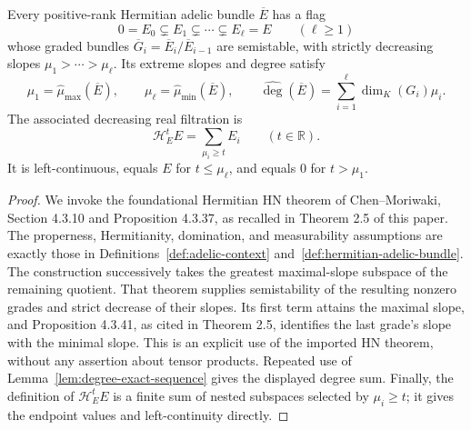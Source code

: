 \begin{theorem}
\label{thm:hermitian-hn-filtration}
\leanok
Every positive-rank Hermitian adelic bundle $\overline E$ has a flag
\[
 0=E_0\subsetneq E_1\subsetneq\cdots\subsetneq E_\ell=E
 \qquad(\ell\ge1)
\]
whose graded bundles $\overline G_i=\overline E_i/\overline E_{i-1}$
are semistable, with strictly decreasing slopes
$\mu_1>\cdots>\mu_\ell$. Its extreme slopes and degree satisfy
\[
 \mu_1=\widehat\mu_{\max}(\overline E),\qquad
 \mu_\ell=\widehat\mu_{\min}(\overline E),\qquad
 \widehat{\deg}(\overline E)=\sum_{i=1}^\ell\dim_K(G_i)\mu_i.
\]
The associated decreasing real filtration is
\[
 \mathcal H_E^tE=\sum_{\mu_i\ge t}E_i\qquad(t\in\mathbb R).
\]
It is left-continuous, equals $E$ for $t\le\mu_\ell$, and equals $0$
for $t>\mu_1$.
\end{theorem}
\begin{proof}
We invoke the foundational Hermitian HN theorem of Chen--Moriwaki,
Section 4.3.10 and Proposition 4.3.37, as recalled in Theorem 2.5 of
this paper. The properness, Hermitianity, domination, and measurability
assumptions are exactly those in Definitions~\ref{def:adelic-context}
and~\ref{def:hermitian-adelic-bundle}. The construction successively
takes the greatest maximal-slope subspace of the remaining quotient.
That theorem supplies semistability of the resulting nonzero grades
and strict decrease of their slopes. Its first term attains the maximal
slope, and Proposition 4.3.41, as cited in Theorem 2.5, identifies the
last grade's slope with the minimal slope. This is an explicit use of
the imported HN theorem, without any assertion about tensor products.
Repeated use of Lemma~\ref{lem:degree-exact-sequence} gives the displayed
degree sum. Finally, the definition of $\mathcal H_E^tE$ is a finite sum
of nested subspaces selected by $\mu_i\ge t$; it gives the endpoint
values and left-continuity directly.
\end{proof}

